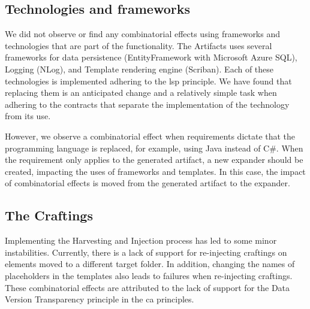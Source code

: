 \subsection{Technologies and frameworks}
We did not observe or find any combinatorial effects using frameworks and technologies
that are part of the functionality. The Artifacts uses several frameworks for data
persistence (EntityFramework with Microsoft Azure SQL), Logging (NLog), and Template
rendering engine (Scriban). Each of these technologies is implemented adhering to the
\gls{lsp} principle. We have found that replacing them is an anticipated change and a
relatively simple task when adhering to the contracts that separate the implementation of
the technology from its use.

However, we observe a combinatorial effect when requirements dictate that the programming
language is replaced, for example, using Java instead of C\#. When the requirement only
applies to the generated artifact, a new expander should be created, impacting the uses of
frameworks and templates. In this case, the impact of combinatorial effects is moved from
the generated artifact to the expander.


\subsection{The Craftings}
Implementing the Harvesting and Injection process has led to some minor instabilities.
Currently, there is a lack of support for re-injecting craftings on elements moved to a
different target folder. In addition, changing the names of placeholders in the templates
also leads to failures when re-injecting craftings. These combinatorial effects are
attributed to the lack of support for the Data Version Transparency principle in the
\gls{ca} principles.
